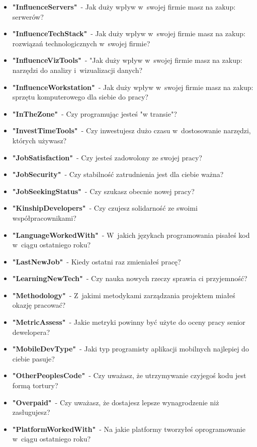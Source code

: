 \begin{appendices}
\begin{itemize}
        \item \textbf{"InfluenceServers"}~- Jak duży wpływ w~swojej firmie masz na zakup: serwerów?
        \item \textbf{"InfluenceTechStack"}~- Jak duży wpływ w~swojej firmie masz na zakup: rozwiązań technologicznych w~swojej firmie?
        \item \textbf{"InfluenceVizTools"}~- "Jak duży wpływ w~swojej firmie masz na zakup: narzędzi do analizy i~wizualizacji danych?
        \item \textbf{"InfluenceWorkstation"}~- Jak duży wpływ w~swojej firmie masz na zakup: sprzętu komputerowego dla siebie do pracy?
        \item \textbf{"InTheZone"}~- Czy programując jesteś "w transie"?
        \item \textbf{"InvestTimeTools"}~- Czy inwestujesz dużo czasu w~dostosowanie narzędzi, których używasz?
        \item \textbf{"JobSatisfaction"}~- Czy jesteś zadowolony ze swojej pracy?
        \item \textbf{"JobSecurity"}~- Czy stabilność zatrudnienia jest dla ciebie ważna?
        \item \textbf{"JobSeekingStatus"}~- Czy szukasz obecnie nowej pracy?
        \item \textbf{"KinshipDevelopers"}~- Czy czujesz solidarność ze swoimi współpracownikami?
        \item \textbf{"LanguageWorkedWith"}~- W~jakich językach programowania pisałeś kod w~ciągu ostatniego roku?
        \item \textbf{"LastNewJob"}~- Kiedy ostatni raz zmieniałeś pracę?
        \item \textbf{"LearningNewTech"}~- Czy nauka nowych rzeczy sprawia ci przyjemność?
        \item \textbf{"Methodology"}~- Z~jakimi metodykami zarządzania projektem miałeś okazję pracować?
        \item \textbf{"MetricAssess"}~- Jakie metryki powinny być użyte do oceny pracy senior dewelopera?
        \item \textbf{"MobileDevType"}~- Jaki typ programisty aplikacji mobilnych najlepiej do ciebie pasuje?
        \item \textbf{"OtherPeoplesCode"}~- Czy uważasz, że utrzymywanie czyjegoś kodu jest formą tortury?
        \item \textbf{"Overpaid"}~- Czy uważasz, że dostajesz lepsze wynagrodzenie niż zasługujesz?
        \item \textbf{"PlatformWorkedWith"}~- Na jakie platformy tworzyłeś oprogramowanie w~ciągu ostatniego roku?

\end{itemize}
\end{appendices}
